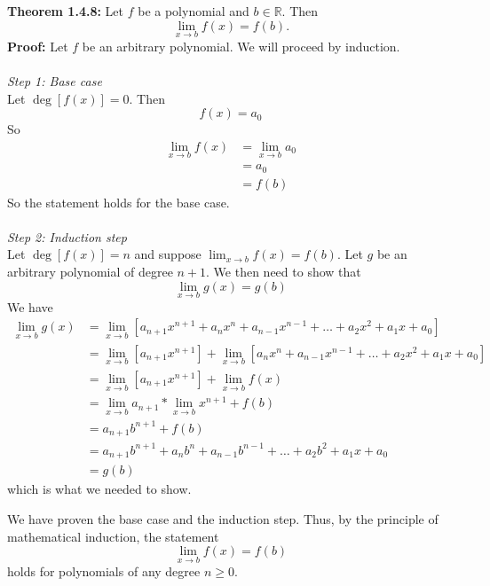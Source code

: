 \documentclass{article}
\begin{document}
	\textbf{Theorem 1.4.8:} Let $f$ be a polynomial and $b \in \mathbb{R}$. Then
	$$\lim_{x \to b}{f(x)} = f(b).$$
	\textbf{Proof:}
	Let $f$ be an arbitrary polynomial. We will proceed by induction. \\\\
	\textit{Step 1: Base case} \\
	Let $\deg{[f(x)]} = 0$. Then
	$$f(x) = a_0$$
	So
	\begin{align*}
		\lim_{x \to b}{f(x)} &= \lim_{x \to b}{a_0} \\
		                     &= a_0 \tag{Theorem 1.3.3} \\
		                     &= f(b)
	\end{align*}
	So the statement holds for the base case. \\\\
	\textit{Step 2: Induction step} \\
	Let $\deg{[f(x)] = n}$ and suppose $\lim_{x \to b}{f(x)} = f(b)$. Let $g$ be an arbitrary polynomial of degree $n + 1$. We then need to show that
	$$\lim_{x \to b}{g(x)} = g(b)$$
	We have
	\begin{align*}
		\lim_{x \to b}{g(x)} &= \lim_{x \to b}{\left[a_{n+1}x^{n+1} + a_nx^n + a_{n-1}x^{n-1} + \ldots + a_2x^2 + a_1x + a_0\right]} \\
		                     &= \lim_{x \to b}{\left[a_{n+1}x^{n+1}\right] + \lim_{x \to b}\left[a_nx^n + a_{n-1}x^{n-1} + \ldots + a_2x^2 + a_1x + a_0\right]} \tag{Theorem 1.4.1} \\
		                     &=  \lim_{x \to b}{\left[a_{n+1}x^{n+1}\right]} + \lim_{x \to b}{f(x)}\\
		                     &= \lim_{x \to b}{a_{n+1}} * \lim_{x \to b}{x^{n+1}} + f(b) \tag{Theorem 1.4.2}\\
		                     &= a_{n+1}b^{n+1} + f(b) \tag{Theorem 1.3.3 and 1.4.7}\\
		                     &= a_{n+1}b^{n+1} + a_nb^n + a_{n-1}b^{n-1} + \ldots + a_2b^2 + a_1x + a_0 \\
		                     &= g(b)
	\end{align*}
	which is what we needed to show.
	
	We have proven the base case and the induction step. Thus, by the principle of mathematical induction, the statement
	$$\lim_{x \to b}{f(x)} = f(b)$$
	holds for polynomials of any degree $n \geq 0$.
	 
\end{document}

